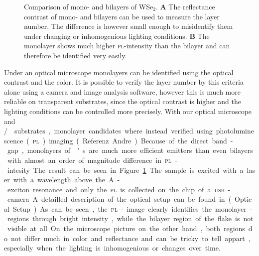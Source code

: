 \begin{figure}
	\centering
	\begin{subfigure}{0.4\textwidth}
	\caption{}
	\end{subfigure}
	\begin{subfigure}{0.4\textwidth}
	\caption{}
	\end{subfigure}
	\caption{Comparison of mono- and bilayers of WSe$_2$. \textbf{A} The reflectance contrast of mono- and bilayers can be used to measure the layer number. The difference is however small enough to misidentify them under changing or inhomogenious lighting conditions. \textbf{B} The monolayer shows much higher \textsc{pl}-intensity than the bilayer and can therefore be identified very easily.}
	\label{pl-contrast}
\end{figure}

Under an optical microscope monolayers can be identified using the optical contrast and the color. It is possible to verify the layer number by this criteria alone using a camera and image analysis software\cite{funk_spectroscopy_2017}, however this is much more reliable on transparent substrates, since the optical contrast is higher and the lighting conditions can be controlled more precisely. With our optical microscope and \si/\sio substrates, monolayer candidates where instead verified using photoluminescence (\textsc{pl}) imaging(Referenz Andre). Because of the direct band-gap, monolayers of \tmd's are much more efficient emitters than even bilayers with almost an order of magnitude difference in \textsc{pl}-intesity. The result can be seen in Figure \ref{pl-contrast}. The sample is excited with a laser with a wavelength above the A-exciton resonance and only the \textsc{pl} is collected on the chip of a \textsc{usb}-camera. A detailled description of the optical setup can be found in (Optical Setup). As can be seen, the \textsc{pl}-image clearly identifies the monolayer-regions through bright intensity, while the bilayer region of the flake is not visible at all. On the microscope picture on the other hand, both regions do not differ much in color and reflectance and can be tricky to tell appart, especially when the lighting is inhomogenious or changes over time.

